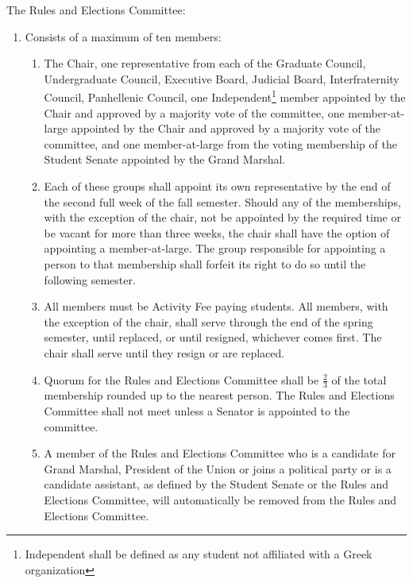 \item The Rules and Elections Committee:
\begin{enumerate}
\item Consists of a maximum of ten members:
\begin{enumerate}
\item The Chair, one representative from each of the Graduate Council, Undergraduate Council, Executive Board, Judicial
Board, Interfraternity Council, Panhellenic Council, one Independent\footnote{Independent shall be defined as any student not affiliated with a Greek organization} member appointed by the Chair and approved
by a majority vote of the committee, one member-at-large appointed by the Chair and approved by a majority vote of
the committee, and one member-at-large from the voting membership of the Student Senate appointed by the Grand
Marshal.
\item Each of these groups shall appoint its own representative by the end of the second full week of the fall semester.
Should any of the memberships, with the exception of the chair, not be appointed by the required time or be vacant
for more than three weeks, the chair shall have the option of appointing a member-at-large. The group responsible for
appointing a person to that membership shall forfeit its right to do so until the following semester.
\item All members must be Activity Fee paying students. All members, with the exception of the chair, shall serve through
the end of the spring semester, until replaced, or until resigned, whichever comes first. The chair shall serve until they
resign or are replaced.
\item Quorum for the Rules and Elections Committee shall be $\frac{2}{3}$ of the total membership rounded up to the nearest
person. The Rules and Elections Committee shall not meet unless a Senator is appointed to the committee.
\item A member of the Rules and Elections Committee who is a candidate for Grand Marshal, President of the Union or
joins a political party or is a candidate assistant, as defined by the Student Senate or the Rules and Elections
Committee, will automatically be removed from the Rules and Elections Committee.
\end{enumerate}


\end{enumerate}
